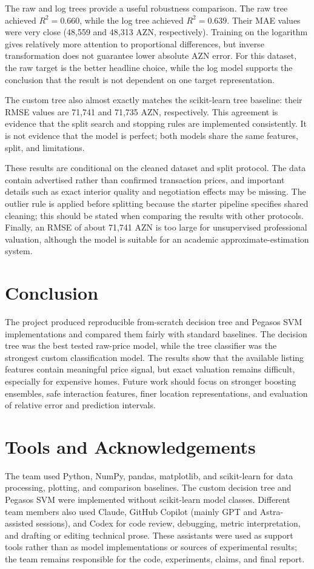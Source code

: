 \documentclass[10pt,twocolumn,a4paper]{article}
\begin{document}
The raw and log trees provide a useful robustness comparison. The raw tree
achieved $R^2=0.660$, while the log tree achieved $R^2=0.639$. Their MAE
values were very close (48,559 and 48,313 AZN, respectively). Training on
the logarithm gives relatively more attention to proportional differences,
but inverse transformation does not guarantee lower absolute AZN error.
For this dataset, the raw target is the better headline choice, while the
log model supports the conclusion that the result is not dependent on one
target representation.

The custom tree also almost exactly matches the scikit-learn tree baseline:
their RMSE values are 71,741 and 71,735 AZN, respectively. This agreement
is evidence that the split search and stopping rules are implemented
consistently. It is not evidence that the model is perfect; both models
share the same features, split, and limitations.

These results are conditional on the cleaned dataset and split protocol.
The data contain advertised rather than confirmed transaction prices, and
important details such as exact interior quality and negotiation effects
may be missing. The outlier rule is applied before splitting because the
starter pipeline specifies shared cleaning; this should be stated when
comparing the results with other protocols. Finally, an RMSE of about
71,741 AZN is too large for unsupervised professional valuation, although
the model is suitable for an academic approximate-estimation system.

\section{Conclusion}
The project produced reproducible from-scratch decision tree and Pegasos
SVM implementations and compared them fairly with standard baselines.
The decision tree was the best tested raw-price model, while the tree
classifier was the strongest custom classification model. The results
show that the available listing features contain meaningful price signal,
but exact valuation remains difficult, especially for expensive homes.
Future work should focus on stronger boosting ensembles, safe interaction
features, finer location representations, and evaluation of relative
error and prediction intervals.

\section*{Tools and Acknowledgements}
The team used Python, NumPy, pandas, matplotlib, and scikit-learn for
data processing, plotting, and comparison baselines. The custom decision
tree and Pegasos SVM were implemented without scikit-learn model classes.
Different team members also used Claude, GitHub Copilot (mainly GPT and
Astra-assisted sessions), and Codex for code review, debugging, metric
interpretation, and drafting or editing technical prose. These assistants
were used as support tools rather than as model implementations or sources
of experimental results; the team remains responsible for the code,
experiments, claims, and final report.
\end{document}
